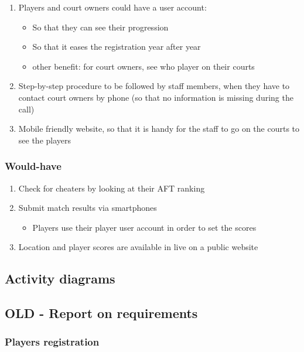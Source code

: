 \begin{enumerate}
\begin{itemize}
		\end{itemize}
	\item Players and court owners could have a user account:
		\begin{itemize}
			\item So that they can see their progression
			\item So that it eases the registration year after year
			\item other benefit: for court owners, see who player on their courts
		\end{itemize}
	\item Step-by-step procedure to be followed by staff members, when they have to contact court owners by phone (so that no information is missing during the call)
	\item Mobile friendly website, so that it is handy for the staff to go on the courts to see the players
\end{enumerate}

\subsubsection{Would-have}

\begin{enumerate}
	\item Check for cheaters by looking at their AFT ranking
	\item Submit match results via smartphones
		\begin{itemize}
			\item Players use their player user account in order to set the scores
		\end{itemize}
	\item Location and player scores are available in live on a public website
\end{enumerate}

\subsection{Activity diagrams}
\subsection{OLD - Report on requirements}

\subsubsection{Players registration}

